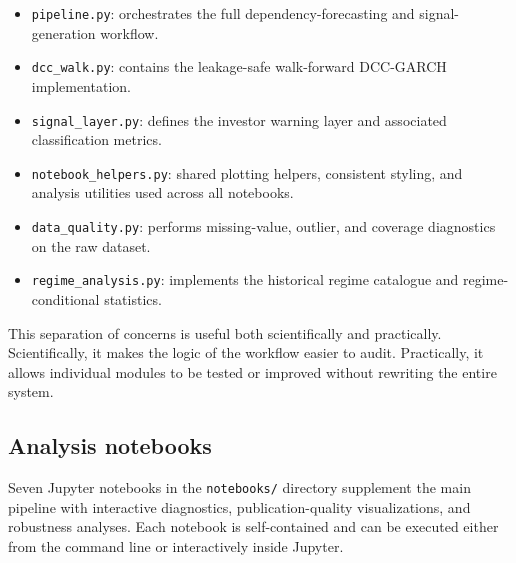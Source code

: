 \begin{itemize}
    \item \texttt{pipeline.py}: orchestrates the full dependency-forecasting and signal-generation workflow.
    \item \texttt{dcc\_walk.py}: contains the leakage-safe walk-forward DCC-GARCH implementation.
    \item \texttt{signal\_layer.py}: defines the investor warning layer and associated classification metrics.
    \item \texttt{notebook\_helpers.py}: shared plotting helpers, consistent styling, and analysis utilities used across all notebooks.
    \item \texttt{data\_quality.py}: performs missing-value, outlier, and coverage diagnostics on the raw dataset.
    \item \texttt{regime\_analysis.py}: implements the historical regime catalogue and regime-conditional statistics.
\end{itemize}

This separation of concerns is useful both scientifically and practically. Scientifically, it makes the logic of the workflow easier to audit. Practically, it allows individual modules to be tested or improved without rewriting the entire system.

\subsection{Analysis notebooks}

Seven Jupyter notebooks in the \texttt{notebooks/} directory supplement the main pipeline with interactive diagnostics, publication-quality visualizations, and robustness analyses. Each notebook is self-contained and can be executed either from the command line or interactively inside Jupyter.

